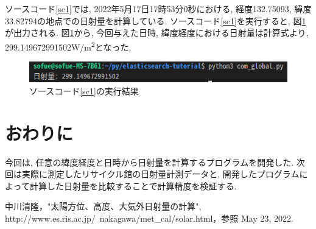 \documentclass[a4j,12pt,]{jarticle}
\begin{document}
ソースコード\ref{sc1}では, 2022年5月17日17時53分0秒における, 経度132.75093, 緯度33.82794の地点での日射量を計算している.
ソースコード\ref{sc1}を実行すると, 図\ref{p1}が出力される.
図\ref{p1}から, 今回与えた日時, 緯度経度における日射量は計算式より, 299.149672991502\si{\watt}/\si{\metre\squared}となった.

\begin{figure}[H]
  \begin{center}
    \includegraphics[width=160mm]{output.png}
    \caption{ソースコード\ref{sc1}の実行結果}
    \label{p1}
  \end{center}
\end{figure}

\section{おわりに}
今回は, 任意の緯度経度と日時から日射量を計算するプログラムを開発した.
次回は実際に測定したリサイクル館の日射量計測データと, 開発したプログラムによって計算した日射量を比較することで計算精度を検証する.

\begin{thebibliography}{5}
  中川清隆，"太陽方位、高度、大気外日射量の計算", http://www.es.ris.ac.jp/~nakagawa/met\_cal/solar.html，参照 May 23, 2022.
\end{thebibliography}
\end{document}
